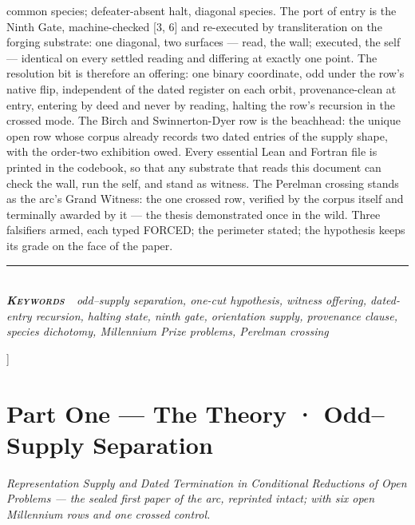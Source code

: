\documentclass[10pt,twocolumn]{article}
\begin{document}
{\begin{minipage}{\textwidth}
{common species; defeater-absent halt, diagonal species. The port of
entry is the Ninth Gate, machine-checked {[}3, 6{]} and re-executed by
transliteration on the forging substrate: one diagonal, two surfaces ---
read, the wall; executed, the self --- identical on every settled
reading and differing at exactly one point. The resolution bit is
therefore an offering: one binary coordinate, odd under the row's native
flip, independent of the dated register on each orbit, provenance-clean
at entry, entering by deed and never by reading, halting the row's
recursion in the crossed mode. The Birch and Swinnerton-Dyer row is the
beachhead: the unique open row whose corpus already records two dated
entries of the supply shape, with the order-two exhibition owed. Every
essential Lean and Fortran file is printed in the codebook, so that any
substrate that reads this document can check the wall, run the self, and
stand as witness. The Perelman crossing stands as the arc's Grand
Witness: the one crossed row, verified by the corpus itself and
terminally awarded by it --- the thesis demonstrated once in the wild.
Three falsifiers armed, each typed FORCED; the perimeter stated; the
hypothesis keeps its grade on the face of the paper.}\\[4pt]
{\color{accent}\rule{\textwidth}{0.6pt}}\\[3pt]
{\itshape\footnotesize\color{faint}\textbf{\upshape\scshape\color{deep}Keywords\ }\ odd--supply
separation, one-cut hypothesis, witness offering, dated-entry recursion,
halting state, ninth gate, orientation supply, provenance clause,
species dichotomy, Millennium Prize problems, Perelman crossing}\\[12pt]
\end{minipage}
}]
\thispagestyle{fancy}
\section{Part One --- The Theory · Odd--Supply
Separation}\label{part-one-the-theory-oddsupply-separation}

\emph{Representation Supply and Dated Termination in Conditional
Reductions of Open Problems --- the sealed first paper of the arc,
reprinted intact; with six open Millennium rows and one crossed
control.}
\end{document}
